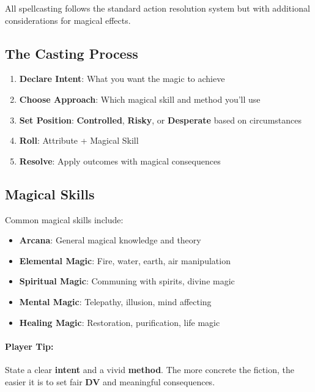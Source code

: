 All spellcasting follows the standard action resolution system but with additional considerations for magical effects.

\subsection*{The Casting Process}
\begin{enumerate}
\item \textbf{Declare Intent}: What you want the magic to achieve
\item \textbf{Choose Approach}: Which magical skill and method you'll use
\item \textbf{Set Position}: \textbf{Controlled}, \textbf{Risky}, or \textbf{Desperate} based on circumstances
\item \textbf{Roll}: Attribute + Magical Skill
\item \textbf{Resolve}: Apply outcomes with magical consequences
\end{enumerate}

\subsection*{Magical Skills}
Common magical skills include:
\begin{itemize}
\item \textbf{Arcana}: General magical knowledge and theory
\item \textbf{Elemental Magic}: Fire, water, earth, air manipulation
\item \textbf{Spiritual Magic}: Communing with spirits, divine magic
\item \textbf{Mental Magic}: Telepathy, illusion, mind affecting
\item \textbf{Healing Magic}: Restoration, purification, life magic
\end{itemize}

\paragraph{Player Tip:}
State a clear \textbf{intent} and a vivid \textbf{method}. The more concrete the fiction, the easier it is to set fair \textbf{DV} and meaningful consequences.

